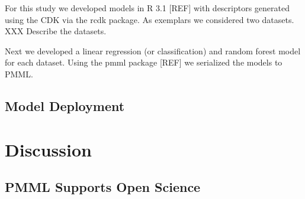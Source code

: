\documentclass[12pt,letterpaper]{article}
\begin{document}
For this study we developed models in R 3.1 [REF] with descriptors
generated using the CDK \cite{Steinbeck:2003bh} via the rcdk
\cite{Guha:2007aa} package. As exemplars we considered two
datasets. XXX Describe the datasets.

Next we developed a linear regression (or classification) and random
forest  model  for each dataset. Using the pmml package [REF] we
serialized the models to PMML.

\subsection{Model Deployment}
\label{sec:model-deployment}


\section{Discussion}
\label{sec:discussion}

\subsection{PMML Supports Open Science}
\label{sec:pmml-supports-open}




\end{document}

